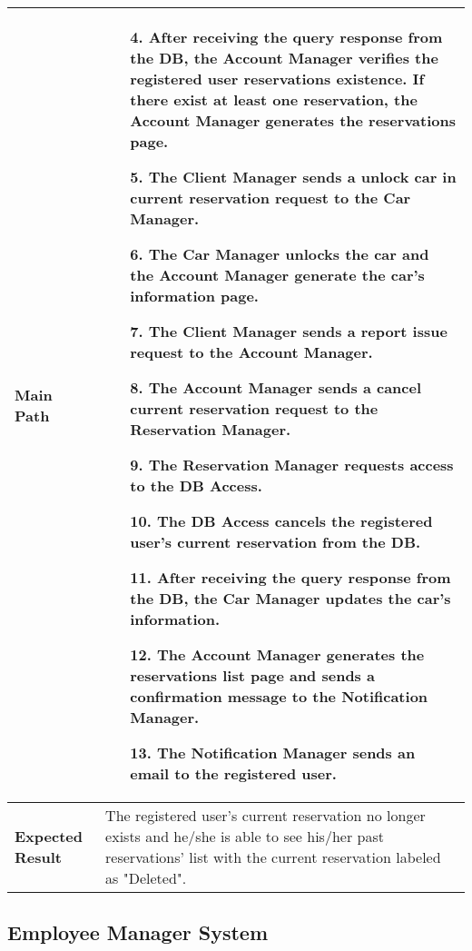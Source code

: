 \begin{center}
		\begin{tabular} { | m{4.5cm} | m{8.5cm} | }
			\textbf{Main Path} & 
			\begin{enumerate}
				\item [4.]  After receiving the query response from the \textbf{DB}, the \textbf{Account Manager} verifies the registered user reservations existence. If there exist at least one reservation, the \textbf{Account Manager} generates the reservations page. 
			\item [5.] The \textbf{Client Manager} sends a unlock car in current reservation request to the \textbf{Car Manager}.
			\item [6.] The \textbf{Car Manager} unlocks the car and the \textbf{Account Manager} generate the car's information page.
			\item [7.] The \textbf{Client Manager} sends a report issue request to the \textbf{Account Manager}.
			\item [8.] The \textbf{Account Manager} sends a cancel current reservation request to the \textbf{Reservation Manager}.
			\item [9.] The \textbf{Reservation Manager} requests access to the \textbf{DB Access}.
			\item [10.] The \textbf{DB Access} cancels the registered user's current reservation from the \textbf{DB}.
			\item [11.] After receiving the query response from the \textbf{DB}, the \textbf{Car Manager} updates the car's information.
			\item [12.] The \textbf{Account Manager} generates the reservations list page and sends a confirmation message to the \textbf{Notification Manager}.
			\item [13.] The \textbf{Notification Manager} sends an email to the registered user.
		\end{enumerate}\\
		\hline
		\textbf{Expected Result} & The registered user's current reservation no longer exists and he/she is able to see his/her past reservations' list with the current reservation labeled as "Deleted".\\
		\hline
	\end{tabular}
\end{center}
\newpage
\subsection{Employee Manager System}

